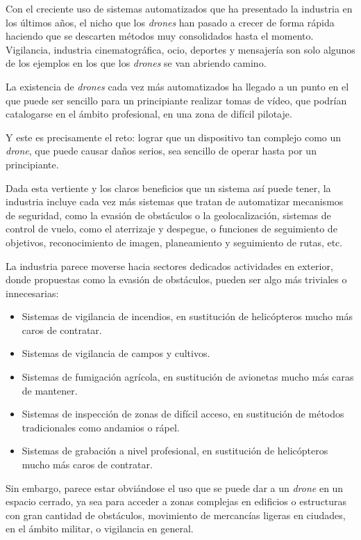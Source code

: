 

Con el creciente uso de sistemas automatizados que ha presentado la industria en los últimos años, el nicho que los \emph{drones} han pasado a  crecer de forma rápida haciendo que se descarten métodos muy consolidados hasta el momento. 
Vigilancia, industria cinematográfica, ocio, deportes y mensajería son solo algunos de los ejemplos en los que los \emph{drones} se van abriendo camino. 

La existencia de \emph{drones} cada vez más automatizados ha llegado a un punto en el que puede ser sencillo para un principiante realizar tomas de vídeo, que podrían catalogarse en el ámbito profesional, en una zona de difícil pilotaje.

Y este es precisamente el reto: lograr que un dispositivo tan complejo como un \emph{drone}, que puede causar daños serios, sea sencillo de operar hasta por un principiante. 

Dada esta vertiente y los claros beneficios que un sistema así puede tener, la industria incluye cada vez más sistemas que tratan de automatizar mecanismos de seguridad, como la evasión de obstáculos o la geolocalización, sistemas de control de vuelo, como el aterrizaje y despegue, o funciones de seguimiento de objetivos, reconocimiento de imagen, planeamiento y seguimiento de rutas, etc. 

La industria parece moverse hacia sectores dedicados actividades en exterior, donde propuestas como la evasión de obstáculos, pueden ser algo más triviales o innecesarias:

\begin{itemize}
\item Sistemas de vigilancia de incendios, en sustitución de helicópteros mucho más caros de contratar.
\item Sistemas de vigilancia de campos y cultivos.
\item Sistemas de fumigación agrícola, en sustitución de avionetas mucho más caras de mantener.
\item Sistemas de inspección de zonas de difícil acceso, en sustitución de métodos tradicionales como andamios o rápel.
\item Sistemas de grabación a nivel profesional, en sustitución de helicópteros mucho más caros de contratar.
\end{itemize}

Sin embargo, parece estar obviándose el uso que se puede dar a un \emph{drone} en un espacio cerrado, ya sea para acceder a zonas complejas en edificios o estructuras con gran cantidad de obstáculos, movimiento de mercancías ligeras en ciudades, en el ámbito militar, o vigilancia en general.

